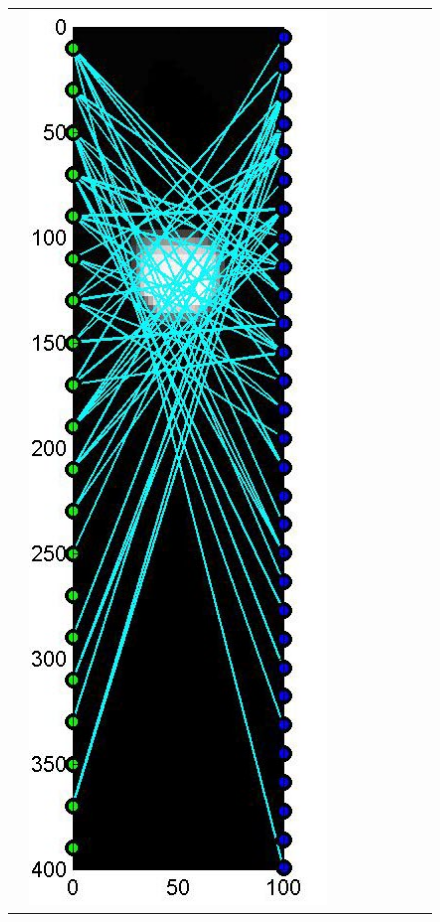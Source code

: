 \documentclass[english]{siamltex}
\begin{document}
{\begin{figure}[!h]
\begin{center}
\begin{tabular}{|c|c|c|c|c|c|c|c|c|}
			&
			\includegraphics[width=.9\iwidth]{figures/newFigs/noisy/resultsExp-2-designs}
			&

\end{tabular}
\end{center}
\end{figure}}
\end{document}
